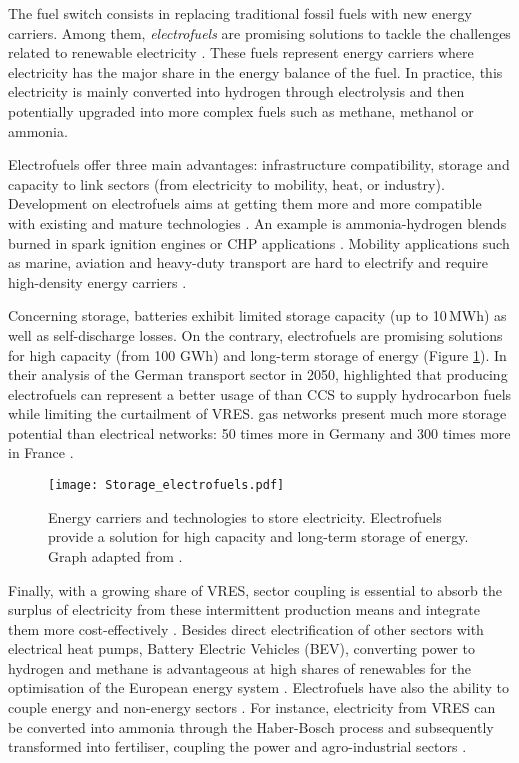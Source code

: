 The fuel switch consists in replacing traditional fossil fuels with new energy carriers.  Among them, \textit{electrofuels} are promising solutions to tackle the challenges related to renewable electricity \cite{rozzi2020}. These fuels represent energy carriers where electricity has the major share in the energy balance of the fuel. In practice, this electricity is mainly converted into hydrogen through electrolysis and then potentially upgraded into more complex fuels such as methane, methanol or ammonia. 

Electrofuels offer three main advantages: infrastructure compatibility, storage and capacity to link sectors (\ie from electricity to mobility, heat, or industry). Development on electrofuels aims at getting them more and more compatible with existing and mature technologies \cite{Ahlgren2012}. An example is ammonia-hydrogen blends burned in spark ignition engines \cite{lhuillier2020experimental} or \gls{CHP} applications \cite{pochet202022}. Mobility applications such as marine, aviation and heavy-duty transport are hard to electrify and require high-density energy carriers \cite{horvath2018techno, brynolf2018}.  

Concerning storage,  batteries exhibit limited storage capacity (up to 10\,MWh) as well as self-discharge losses. On the contrary, electrofuels are promising solutions for high capacity (from 100 GWh) and long-term storage of energy \cite{child2018role, dias2020energy} (Figure \ref{fig:intro:Storage_electrofuels}). In their analysis of the German transport sector in 2050, \citet{millinger2021electrofuels} highlighted that producing electrofuels can represent a better usage of  than \gls{CCS} to supply hydrocarbon fuels while limiting the curtailment of \gls{VRES}.  gas networks present much more storage potential than electrical networks: 50 times more in Germany and 300 times more in France \cite{Rosa2017}. 

\begin{figure}[htbp!]
\centering
\texttt{[image: Storage\_electrofuels.pdf]}
\caption{Energy carriers and technologies to store electricity. Electrofuels provide a solution for high capacity and long-term storage of energy. Graph adapted from \cite{ISPT2017}.}
\label{fig:intro:Storage_electrofuels}
\end{figure}

Finally, with a growing share of \gls{VRES}, sector coupling is essential to absorb the surplus of electricity from these intermittent production means \cite{robinius2017linking} and integrate them more cost-effectively \cite{brown2018response, limpensECOS2021}. Besides direct electrification of other sectors with electrical heat pumps, Battery Electric Vehicles (BEV),  converting power to hydrogen and methane is advantageous at high shares of renewables for the optimisation of the European energy system \cite{brown2018synergies}. Electrofuels have also the ability to couple energy and non-energy sectors \cite{Stancin2020}. For instance, electricity from \gls{VRES} can be converted into ammonia through the Haber-Bosch process and subsequently transformed into fertiliser, coupling the power and agro-industrial sectors \cite{verleysen2020can}. 


